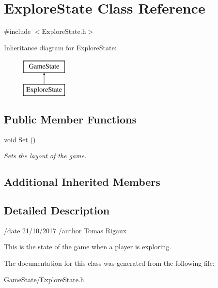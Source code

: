 \hypertarget{classExploreState}{\section{Explore\-State Class Reference}
\label{classExploreState}
}


{\ttfamily \#include $<$Explore\-State.\-h$>$}

Inheritance diagram for Explore\-State\-:\begin{figure}[H]
\begin{center}
\leavevmode
\includegraphics[height=2.000000cm]{classExploreState}
\end{center}
\end{figure}
\subsection*{Public Member Functions}
\begin{DoxyCompactItemize}
\item 
\hypertarget{classExploreState_a8fb38f9fca513b87d914d077a0f2652b}{void \hyperlink{classExploreState_a8fb38f9fca513b87d914d077a0f2652b}{Set} ()}\label{classExploreState_a8fb38f9fca513b87d914d077a0f2652b}

\begin{DoxyCompactList}\small\item\em Sets the layout of the game. \end{DoxyCompactList}\end{DoxyCompactItemize}
\subsection*{Additional Inherited Members}


\subsection{Detailed Description}
/date 21/10/2017 /author Tomas Rigaux

This is the state of the game when a player is exploring. 

The documentation for this class was generated from the following file\-:\begin{DoxyCompactItemize}
\item 
Game\-State/Explore\-State.\-h\end{DoxyCompactItemize}
